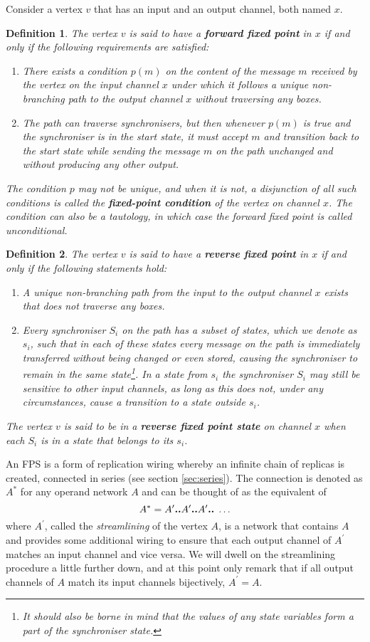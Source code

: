 \documentclass[11pt]{report}
\newtheorem*{mydef}{Definition}
\begin{document}
Consider a vertex $v$ that has an input and an output channel, both named $x$.
\begin{mydef} The vertex $v$ is said to have a {\bf forward fixed point} in $x$ if and only if the following requirements are satisfied:
\begin{enumerate}
\item There exists a condition $p(m)$ on the content of the message $m$ received by the vertex on the input channel $x$ under which it follows a unique non-branching path to the output channel $x$ without traversing any boxes.
\item The path can traverse synchronisers, but then whenever $p(m)$ is true and the synchroniser is in the start state, it must accept $m$ and transition back to the start state while sending the message $m$ on the path unchanged and without producing any other output.
\end{enumerate}
The condition $p$ may not be unique, and when it is not,  a disjunction of all such conditions is called the {\bf fixed-point condition} of the vertex on channel $x$. The condition can also be a tautology, in which case the forward fixed point is called unconditional.
\end{mydef}
\begin{mydef}
The vertex $v$ is said to have a {\bf reverse fixed point} in $x$ if and only if the following statements hold:
\begin{enumerate}
\item A unique non-branching path from the input to the output channel $x$ exists that does not traverse any boxes.
\item Every synchroniser $S_i$ on the path has a subset of states, which we denote as $s_i$, such that in each of these states every message on the path is immediately transferred without being changed or even stored, causing the synchroniser to remain in the same state\footnote{It should also be borne in mind that the values of any state variables form a part of the synchroniser state.}. In a state from $s_i$ the synchroniser $S_i$ may still be sensitive to other input channels, as long as this does not, under any circumstances, cause a transition to a state outside $s_i$.
\end{enumerate}
The vertex $v$ is said to be in a {\bf reverse fixed point state} on channel $x$ when each $S_i$ is in a state that belongs to its $s_i$.
\end{mydef}
An FPS is a form of replication wiring whereby an infinite chain of replicas is created, connected in series (see section \ref{sec:series}). The connection is denoted as $A^*$ for any operand network $A$ and can be thought of as the equivalent of
\[
A^* = A^\prime\hbox{\bf ..}A^\prime\hbox{\bf ..}A^\prime\hbox{\bf ..}\; \ldots
\]
where $A^\prime$, called the {\em streamlining} of the vertex $A$, is a network that contains $A$ and provides some additional wiring to ensure that each output channel of $A^\prime$ matches an input channel
and vice versa. We will dwell on the streamlining procedure a little further down, and at this point only remark that if all output channels of $A$ match its input channels bijectively, $A^\prime=A$.
\end{document}
